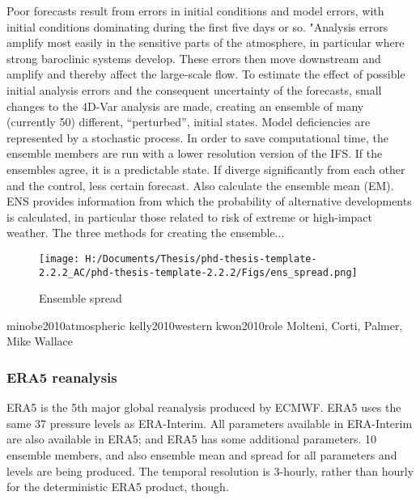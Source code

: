 %


Poor forecasts result from errors in initial conditions and model errors, with initial conditions dominating during the first five days or so. "Analysis errors amplify most easily in the sensitive parts of the
atmosphere, in particular where strong baroclinic systems develop. These errors then move
downstream and amplify and thereby affect the large-scale flow. To estimate the effect of
possible initial analysis errors and the consequent uncertainty of the forecasts, small changes
to the 4D-Var analysis are made, creating an ensemble of many (currently 50) different,
“perturbed”, initial states. Model deficiencies are represented by a stochastic process. In order
to save computational time, the ensemble members are run with a lower resolution version of
the IFS. 
If the ensembles agree, it is a predictable state. If diverge significantly from each other and the control, less certain forecast. Also calculate the ensemble mean (EM). ENS provides information from which the probability of alternative
developments is calculated, in particular those related to risk of extreme or high-impact
weather. The three methods for creating the ensemble...

%	

\begin{figure}
	
	\texttt{[image: H:/Documents/Thesis/phd-thesis-template-2.2.2\_AC/phd-thesis-template-2.2.2/Figs/ens\_spread.png]}
	\caption{Ensemble spread}\label{fig:ens_spread}
	\centering
\end{figure}

minobe2010atmospheric
kelly2010western
kwon2010role
Molteni, Corti, Palmer, Mike Wallace



\subsubsection {ERA5 reanalysis}  \label{ECMWF_ERA5}
ERA5 is the 5th major global reanalysis produced by ECMWF.
ERA5 uses the same 37 pressure levels as ERA-Interim.
All parameters available in ERA-Interim are also available in ERA5; and ERA5 has some additional parameters.
10 ensemble members, and also ensemble mean and spread for all parameters and levels are being produced. The temporal resolution is 3-hourly, rather than hourly for the deterministic ERA5 product, though.


